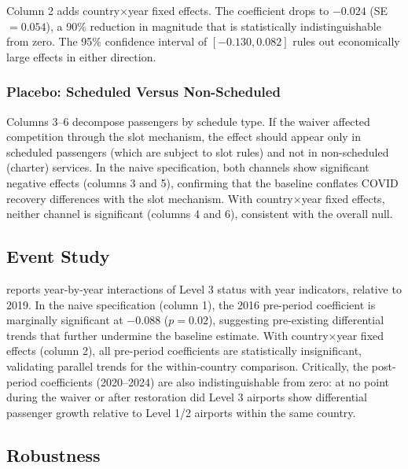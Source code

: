 \documentclass[12pt]{article}
\begin{document}
Column 2 adds country$\times$year fixed effects. The coefficient drops to $-0.024$ (SE $= 0.054$), a 90\% reduction in magnitude that is statistically indistinguishable from zero. The 95\% confidence interval of $[-0.130, 0.082]$ rules out economically large effects in either direction.

\subsubsection*{Placebo: Scheduled Versus Non-Scheduled} Columns 3--6 decompose passengers by schedule type. If the waiver affected competition through the slot mechanism, the effect should appear only in scheduled passengers (which are subject to slot rules) and not in non-scheduled (charter) services. In the naive specification, both channels show significant negative effects (columns 3 and 5), confirming that the baseline conflates COVID recovery differences with the slot mechanism. With country$\times$year fixed effects, neither channel is significant (columns 4 and 6), consistent with the overall null.



\subsection{Event Study}

 reports year-by-year interactions of Level 3 status with year indicators, relative to 2019. In the naive specification (column 1), the 2016 pre-period coefficient is marginally significant at $-0.088$ ($p = 0.02$), suggesting pre-existing differential trends that further undermine the baseline estimate. With country$\times$year fixed effects (column 2), all pre-period coefficients are statistically insignificant, validating parallel trends for the within-country comparison. Critically, the post-period coefficients (2020--2024) are also indistinguishable from zero: at no point during the waiver or after restoration did Level 3 airports show differential passenger growth relative to Level 1/2 airports within the same country.



\subsection{Robustness}
\end{document}
